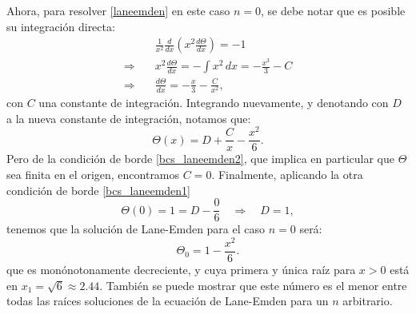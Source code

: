 Ahora, para resolver \eqref{laneemden} en este caso $n=0$, se debe notar que es posible su integración directa:
\begin{align}
 &\frac{1}{x^2}\frac{d}{dx}\left(x^2\frac{d\Theta}{dx}\right)=-1\\
\Rightarrow \quad &x^2\frac{d\Theta}{dx}=-\int x^2\,dx=-\frac{x^3}{3}-C\\
\Rightarrow\quad &\frac{d\Theta}{dx}=-\frac{x}{3}-\frac{C}{x^2},
\end{align}
con $C$ una constante de integración. Integrando nuevamente, y denotando con $D$ a la nueva constante de integración, notamos que:
\begin{equation}
 \Theta(x)=D+\frac{C}{x}-\frac{x^2}{6}.
\end{equation}
Pero de la condición de borde \eqref{bcs_laneemden2}, que implica en particular que $\Theta$ sea finita en el origen, encontramos $C=0$. Finalmente, aplicando la otra condición de borde \eqref{bcs_laneemden1}
\begin{equation}
 \Theta(0)=1=D-\frac{0}{6}\quad\Rightarrow\quad D=1,
\end{equation}
tenemos que la solución de Lane-Emden para el caso $n=0$ será:
\begin{equation}\label{lane0}
 \boxed{\Theta_0=1-\frac{x^2}{6}.}
\end{equation}
que es monónotonamente decreciente, y cuya primera y única raíz para $x>0$ está en $x_1=\sqrt{6}\approx2.44$. También se puede mostrar que este número es el menor entre todas las raíces soluciones de la ecuación de Lane-Emden para un $n$ arbitrario.

